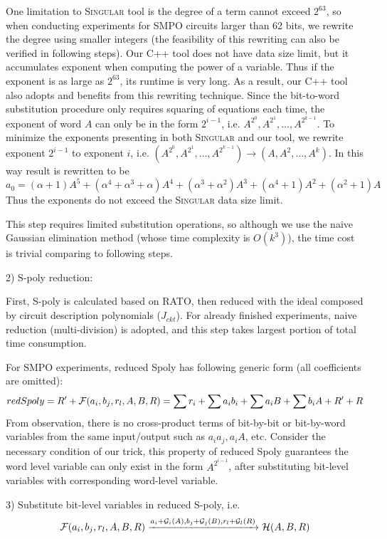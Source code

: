 One limitation to \textsc{Singular} tool is the degree of a term cannot exceed $2^{63}$, so when conducting experiments 
for SMPO circuits larger than
62 bits, we rewrite the degree using smaller integers (the feasibility of this rewriting can also be verified 
in following steps). Our C++ tool does not have data size limit, but it accumulates exponent when computing 
the power of a variable. Thus if the exponent is as large as $2^{63}$, its runtime is very long. As a 
result, our C++ tool also adopts and benefits from this rewriting technique.
Since the bit-to-word substitution procedure
only requires squaring of equations each time, the exponent of word $A$ can only be in the form $2^{i-1}$, i.e. 
$A^{2^0},A^{2^1},\dots,A^{2^{k-1}}$. To minimize the exponents presenting in both \textsc{Singular} and our tool, 
we rewrite exponent $2^{i-1}$ to exponent $i$, i.e.
$(A^{2^0},A^{2^1},\dots,A^{2^{k-1}}) \to (A, A^2, \dots, A^k)$. In this way result is rewritten to be
$$a_0 = (\alpha+1)A^5+(\alpha^4+\alpha^3+\alpha)A^4+(\alpha^3+\alpha^2)A^3+(\alpha^4+1)A^2+(\alpha^2+1)A$$
Thus the exponents do not exceed the \textsc{Singular} data size limit.

This step requires limited substitution operations, so although we use the naive Gaussian elimination
method (whose time complexity is $O(k^3)$), the time cost is trivial comparing to following steps. 

2) S-poly reduction:

First, S-poly is calculated based on RATO, then reduced with the ideal composed by circuit description polynomials ($J_{ckt}$).
For already finished experiments, naive reduction (multi-division) is adopted, and this step takes largest portion of total 
time consumption.

For SMPO experiments, reduced Spoly has following generic form (all coefficients are omitted):
$$redSpoly = R'+{\mathcal{F}}(a_i,b_j,r_l,A,B,R) = \sum r_i + \sum a_ib_i + \sum a_iB + \sum b_iA + R' + R$$
From observation, there is no cross-product terms of bit-by-bit or bit-by-word variables from the same input/output
such as $a_ia_j, a_iA$, etc. Consider the necessary
condition of our trick, this property of reduced Spoly guarantees the word level variable can only exist in the form $A^{2^{i-1}}$,
after substituting bit-level variables with corresponding word-level variable.

3) Substitute bit-level variables in reduced S-poly, i.e. 
$${\mathcal{F}}(a_i,b_j,r_l,A,B,R) \xrightarrow{a_i+\mathcal{G}_i(A),b_j+\mathcal{G}_j(B),r_l+\mathcal{G}_l(R)} \mathcal{H}(A,B,R)$$

